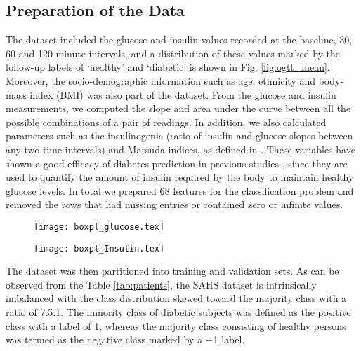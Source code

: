 \documentclass[journal,comsoc]{IEEEtran}
\renewcommand{\^}{\hat}  %
\begin{document}
\subsection{Preparation of the Data}
%
The dataset included the glucose and insulin values recorded at the baseline, \num{30}, \num{60} and \num{120} minute intervals, and a distribution of these values marked by the follow-up labels of `healthy' and `diabetic' is shown in Fig. \ref{fig:ogtt_mean}. Moreover, the socio-demographic information such as age, ethnicity and body-mass index (BMI) was also part of the dataset. From the glucose and insulin measurements, we computed the slope and area under the curve between all the possible combinations  of a pair of readings. In addition, we also calculated parameters such as the insulinogenic (ratio of insulin and glucose slopes between any two time intervals) and Matsuda indices, as defined in \cite{Matsuda1462,abdul-ghani_plasma_2009}. These variables have shown a good efficacy of diabetes prediction in previous studies \cite{abdul-ghani_what_2007,abdul-ghani_plasma_2009}, since they are used to quantify the amount of insulin required by the body to maintain healthy glucose levels. In total we prepared \num{68} features for the classification problem and removed the rows that had missing entries or contained zero or infinite values.
%
\begin{figure*}
  \centering
  \begin{subfigure}[b]{\columnwidth}        %
    \centering
    \texttt{[image: boxpl\_glucose.tex]}
    \label{fig:glucose}
  \end{subfigure}
  \hfill
  \begin{subfigure}[b]{\columnwidth}        %
    \centering
    \texttt{[image: boxpl\_Insulin.tex]}
    \label{fig:insulin}
  \end{subfigure}
  \caption{Box plots of glucose and insulin measurements for healthy and diabetic subjects.}
  \label{fig:ogtt_mean}
\end{figure*}
%
The dataset was then partitioned into training and validation sets. As can be observed from the Table \ref{tab:patients}, the SAHS dataset is intrinsically imbalanced with the class distribution skewed toward the majority class with a ratio of 7.5:1. The minority class of diabetic subjects was defined as the positive class with a label of \num{1}, whereas the majority class consisting of healthy persons was termed as the negative class marked by a \num{-1} label.
%
%
\end{document}
